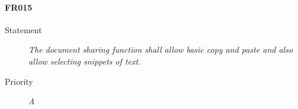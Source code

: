 \paragraph{FR015}
\begin{description}
  \item [Statement] 
  \textit{ The document sharing function shall allow basic copy and paste and also allow selecting snippets of text.}
\item [Priority] \textit{A}
\end{description}


